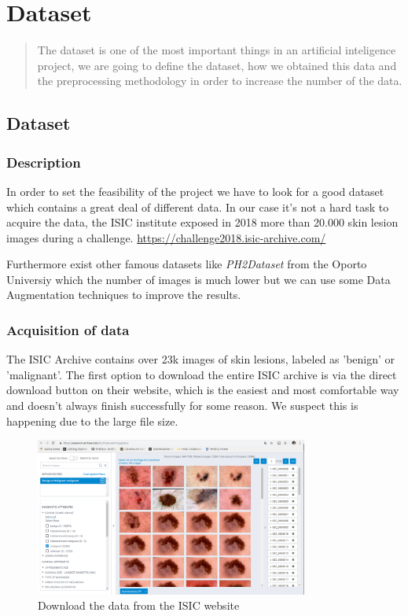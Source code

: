 \chapter{Dataset}

\begin{abstract}
The dataset is one of the most important things in an artificial inteligence project, we are going to define the dataset, how we obtained this data and the preprocessing methodology in order to increase the number of the data. 
\end{abstract}

\section[Dataset]{Dataset}
\subsection{Description}
In order to set the feasibility of the project we have to look for a good dataset which contains a great deal of different data. In our case it's not a hard task to acquire the data, the ISIC institute exposed in 2018 more than 20.000 skin lesion images during a challenge. 
\url{https://challenge2018.isic-archive.com/}

Furthermore exist other famous datasets like \emph{PH2Dataset} from the Oporto Universiy which the number of images is much lower but we can use some Data Augmentation techniques to improve the results.

\subsection{Acquisition of data}

The ISIC Archive contains over 23k images of skin lesions, labeled as 'benign' or 'malignant'. The first option to download the entire ISIC archive is via the direct download button on their website, which is the easiest and most comfortable way and doesn't always finish successfully for some reason. We suspect this is happening due to the large file size. 

\begin{figure}[H]
\centering
\includegraphics[width=0.8\textwidth]{./figures/isic-dataset}
\caption{Download the data from the ISIC website}
\end{figure}


